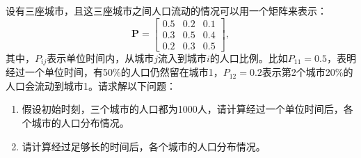 \begin{example}
    设有三座城市，且这三座城市之间人口流动的情况可以用一个矩阵来表示：
    \[
        \mathbf{P} =
        \begin{bmatrix}
            0.5 & 0.2 & 0.1 \\
            0.3 & 0.5 & 0.4 \\
            0.2 & 0.3 & 0.5
        \end{bmatrix},
    \]
    其中，\( P_{ij} \)表示单位时间内，从城市\( j \)流入到城市\( i \)的人口比例。比如\( P_{11} = 0.5 \)，表明经过一个单位时间，有50\%的人口仍然留在城市1，\( P_{12} = 0.2 \)表示第2个城市20\%的人口会流动到城市1。请求解以下问题：
    \begin{enumerate}
        \item 假设初始时刻，三个城市的人口都为1000人，请计算经过一个单位时间后，各个城市的人口分布情况。
        \item 请计算经过足够长的时间后，各个城市的人口分布情况。
    \end{enumerate}
\end{example}
